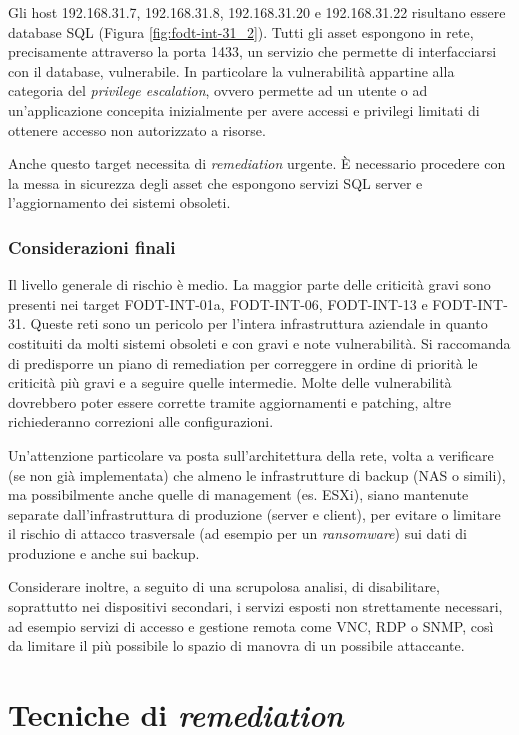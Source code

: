 \documentclass[target=bach,aauheader=]{thud}
\begin{document}
Gli host 192.168.31.7, 192.168.31.8, 192.168.31.20 e 192.168.31.22 risultano essere database SQL (Figura \ref{fig:fodt-int-31_2}). Tutti gli asset espongono in rete, precisamente attraverso la porta 1433, un servizio che permette di interfacciarsi con il database, vulnerabile. In particolare la vulnerabilità appartine alla categoria del \textit{privilege escalation}, ovvero permette ad un utente o ad un'applicazione concepita inizialmente per avere accessi e privilegi limitati di ottenere accesso non autorizzato a risorse.

Anche questo target necessita di \textit{remediation} urgente. È necessario procedere con la messa in sicurezza degli asset che espongono servizi SQL server e l'aggiornamento dei sistemi obsoleti.

\subsection{Considerazioni finali}
Il livello generale di rischio è medio. La maggior parte delle criticità gravi sono presenti nei target FODT-INT-01a, FODT-INT-06, FODT-INT-13 e FODT-INT-31. Queste reti sono un pericolo per l’intera infrastruttura aziendale in quanto costituiti da molti sistemi obsoleti e con gravi e note vulnerabilità. Si raccomanda di predisporre un piano di remediation per correggere in ordine di priorità le criticità più gravi e a seguire quelle intermedie. Molte delle vulnerabilità dovrebbero poter essere corrette tramite aggiornamenti e patching, altre richiederanno correzioni alle configurazioni.

Un’attenzione particolare va posta sull’architettura della rete, volta a verificare (se non già implementata) che almeno le infrastrutture di backup (NAS o simili), ma possibilmente anche quelle di management (es. ESXi), siano mantenute separate dall’infrastruttura di produzione (server e client), per evitare o limitare il rischio di attacco trasversale (ad esempio per un \textit{ransomware}) sui dati di produzione e anche sui backup.

Considerare inoltre, a seguito di una scrupolosa analisi, di disabilitare, soprattutto nei dispositivi secondari, i servizi esposti non strettamente necessari, ad esempio servizi di accesso e gestione remota come VNC, RDP o SNMP, così da limitare il più possibile lo spazio di manovra di un possibile attaccante.

\chapter{Tecniche di \textit{remediation}}
\end{document}

